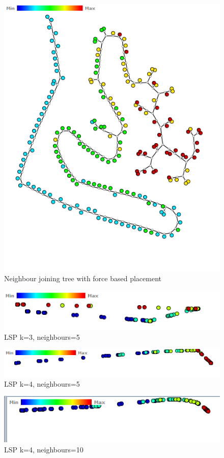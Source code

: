 \documentclass[ 10pt ]{fphw}
\begin{document}
\begin{center}
\begin{figure}[H]
    \centering
	\includegraphics[width=0.45\columnwidth]{hdiProj/hdiNJFB.PNG}
	\caption{Neighbour joining tree with force based placement}
	\label{fig:hdiNJFB}
	\end{figure}
\end{center}

\begin{center}
\begin{figure}[H]
    \centering
	\includegraphics[width=0.65\columnwidth]{hdiProj/hdiLsp3-5.PNG}
	\caption{LSP k=3, neighbours=5}
	\label{fig:hdiLSP3-5}
	\end{figure}
\end{center}

\begin{center}
\begin{figure}[H]
    \centering
	\includegraphics[width=0.65\columnwidth]{hdiProj/hdiLSP-4-5.PNG}
	\caption{LSP k=4, neighbours=5}
	\label{fig:hdiLSP-4-5}
	\end{figure}
\end{center}

\begin{center}
\begin{figure}[H]
    \centering
	\includegraphics[width=0.65\columnwidth]{hdiProj/hdiLSP-4-10.PNG}
	\caption{LSP k=4, neighbours=10}
	\label{fig:hdiLSP-4-10}
	\end{figure}
\end{center}
\end{document}
